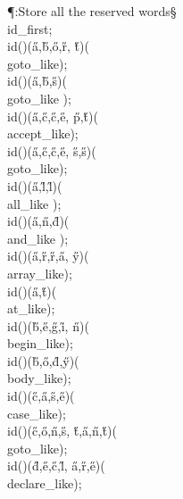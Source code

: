 \Y\P\?\4:Store all the reserved words\X\S\?\6
\\{id\_first}\?\K{};\6
\\{id}\?\1(\?\2)\1(\?\H{a}\?,\?\H{b}\?,\?\H{o}\?,\?\H{r}\?,\?%
\H{t}\?\2)\1(\?\\{goto\_like}\?\2)\?;\6
\\{id}\?\1(\?\2)\1(\?\H{a}\?,\?\H{b}\?,\?\H{s}\?\2)\1(\?\\{goto\_like}%
\?\2)\?;\6
\\{id}\?\1(\?\2)\1(\?\H{a}\?,\?\H{c}\?,\?\H{c}\?,\?\H{e}\?,\?%
\H{p}\?,\?\H{t}\?\2)\1(\?\\{accept\_like}\?\2)\?;\6
\\{id}\?\1(\?\2)\1(\?\H{a}\?,\?\H{c}\?,\?\H{c}\?,\?\H{e}\?,\?%
\H{s}\?,\?\H{s}\?\2)\1(\?\\{goto\_like}\?\2)\?;\6
\\{id}\?\1(\?\2)\1(\?\H{a}\?,\?\H{l}\?,\?\H{l}\?\2)\1(\?\\{all\_like}%
\?\2)\?;\6
\\{id}\?\1(\?\2)\1(\?\H{a}\?,\?\H{n}\?,\?\H{d}\?\2)\1(\?\\{and\_like}%
\?\2)\?;\6
\\{id}\?\1(\?\2)\1(\?\H{a}\?,\?\H{r}\?,\?\H{r}\?,\?\H{a}\?,\?%
\H{y}\?\2)\1(\?\\{array\_like}\?\2)\?;\6
\\{id}\?\1(\?\2)\1(\?\H{a}\?,\?\H{t}\?\2)\1(\?\\{at\_like}\?\2)\?;\6
\\{id}\?\1(\?\2)\1(\?\H{b}\?,\?\H{e}\?,\?\H{g}\?,\?\H{i}\?,\?%
\H{n}\?\2)\1(\?\\{begin\_like}\?\2)\?;\6
\\{id}\?\1(\?\2)\1(\?\H{b}\?,\?\H{o}\?,\?\H{d}\?,\?\H{y}\?\2)\1(\?%
\\{body\_like}\?\2)\?;\6
\\{id}\?\1(\?\2)\1(\?\H{c}\?,\?\H{a}\?,\?\H{s}\?,\?\H{e}\?\2)\1(\?%
\\{case\_like}\?\2)\?;\6
\\{id}\?\1(\?\2)\1(\?\H{c}\?,\?\H{o}\?,\?\H{n}\?,\?\H{s}\?,\?%
\H{t}\?,\?\H{a}\?,\?\H{n}\?,\?\H{t}\?\2)\1(\?\\{goto\_like}\?\2)\?;\6
\\{id}\?\1(\?\2)\1(\?\H{d}\?,\?\H{e}\?,\?\H{c}\?,\?\H{l}\?,\?%
\H{a}\?,\?\H{r}\?,\?\H{e}\?\2)\1(\?\\{declare\_like}\?\2)\?;\6
